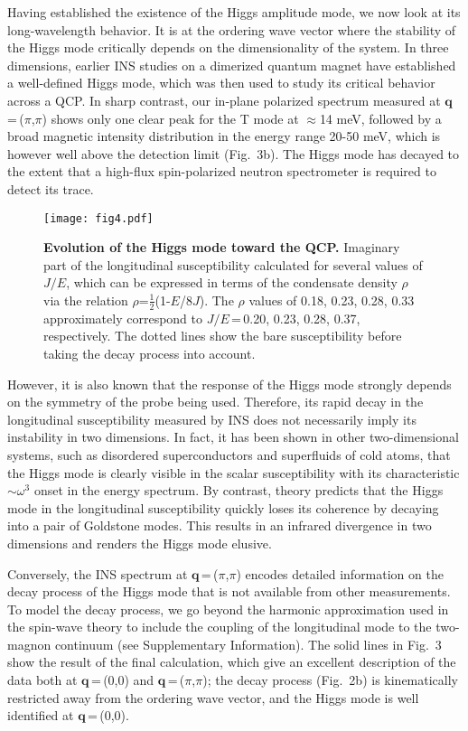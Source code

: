 \documentclass[twocolumn,prb,aps,showpacs]{revtex4-1}
\begin{document}
Having established the existence of the Higgs amplitude mode, we now look at its long-wavelength behavior. 
It is at the ordering wave vector where the stability of the Higgs mode critically depends on the dimensionality of the system. In three dimensions, earlier INS studies on a dimerized quantum magnet have established a well-defined Higgs mode\cite{Ruegg_2008}, which was then used to study its critical behavior across a QCP\cite{Ruegg_2008_2,merchant_2014}. In sharp contrast, our in-plane polarized spectrum measured at $\mathbf{q}$\,=\,($\pi$,$\pi$) shows only one clear peak for the T mode at $\approx$14 meV, followed by a broad magnetic intensity distribution in the energy range 20-50 meV, which is however well above the detection limit (Fig.~3b). The Higgs mode has decayed to the extent that a high-flux spin-polarized neutron spectrometer is required to detect its trace.   

\begin{figure}
\vspace{-4mm}
\centerline{\texttt{[image: fig4.pdf]}}
\caption{{\bf Evolution of the Higgs mode toward the QCP.} Imaginary part of the longitudinal susceptibility calculated for several values of $J/E$, which can be expressed in terms of the condensate density $\rho$ via the relation $\rho$=$\frac{1}{2}$(1-$E$/8$J$). The $\rho$ values of 0.18, 0.23, 0.28, 0.33 approximately correspond to $J/E$\,=\,0.20,  0.23, 0.28, 0.37, respectively. The dotted lines show the bare susceptibility before taking the decay process into account. }\label{fig:fig1}
\end{figure}

However, it is also known that the response of the Higgs mode strongly depends on the symmetry of the probe being used. Therefore, its rapid decay in the longitudinal susceptibility measured by INS does not necessarily imply its instability in two dimensions. In fact, it has been shown in other two-dimensional systems, such as disordered superconductors\cite{Sherman_2015} and superfluids of cold atoms\cite{Endres_2012}, that the Higgs mode is clearly visible in the scalar susceptibility with its characteristic $\sim$$\omega^3$  onset in the energy spectrum. By contrast, theory predicts that the Higgs mode in the longitudinal susceptibility quickly loses its coherence by decaying into a pair of Goldstone modes\cite{Podolsky_2011,Gazit_2013}. This results in an infrared divergence in two dimensions and renders the Higgs mode elusive.


Conversely, the INS spectrum at $\mathbf{q}$\,=\,($\pi$,$\pi$) encodes detailed information on the decay process of the Higgs mode that is not available from other measurements. To model the decay process, we go beyond the harmonic approximation used in the spin-wave theory to include the coupling of the longitudinal mode to the two-magnon continuum (see Supplementary Information). 
The solid lines in Fig.~3 show the result of the final calculation, which give an excellent description of the data both at $\mathbf{q}$\,=\,(0,0) and $\mathbf{q}$\,=\,($\pi$,$\pi$); the decay process (Fig.~2b) is kinematically restricted away from the ordering wave vector, and the Higgs mode is well identified at $\mathbf{q}$\,=\,(0,0). 
\end{document}
